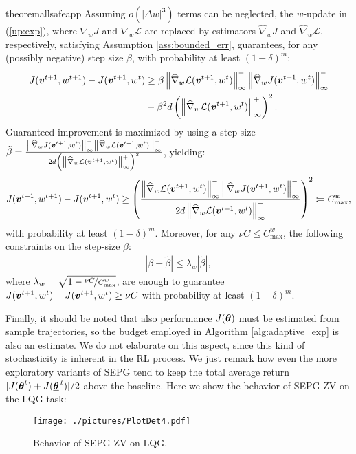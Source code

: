 \begin{restatable}[]{theorem}{allsafeapp}\label{th:safe_expapp}
	Assuming $o(|\Delta w|^3)$ terms can be neglected, the $w$-update in (\ref{up:exp}), where $\nabla_wJ$ and $\nabla_w\mathcal{L}$ are replaced by estimators $\widehat{\nabla}_wJ$ and $\widehat{\nabla}_w\mathcal{L}$, respectively, satisfying Assumption \ref{ass:bounded_err}, guarantees, for any (possibly negative) step size $\beta$, with probability at least $(1-\delta)^m$:
	\begin{align*}
	J(\vv^{t+1},w^{t+1}) - J(\vv^{t+1},w^t) 
	&\geq \beta\norm[\infty]{\widehat{\nabla}_w\mathcal{L}(\vv^{t+1},w^t)}^
	-\norm[\infty]{\widehat{\nabla}_wJ(\vv^{t+1},w^t)}^-\\
	&-
	\beta^2 d \left(\norm[\infty]{\widehat{\nabla}_w\mathcal{L}(\vv^{t+1},w^t)}^+\right)^2.
	\end{align*}
	Guaranteed improvement is maximized by using a step size $\tilde{\beta} =\frac{\norm[\infty]{\widehat{\nabla}_wJ(\vv^{t+1},w^t)}^-\norm[\infty]{\widehat{\nabla}_w\mathcal{L}(\vv^{t+1},w^t)}^-}{2d\left(\norm[\infty]{\widehat{\nabla}_w\mathcal{L}(\vv^{t+1},w^t)}^+\right)^2}$, yielding:
	\begin{align*}
	J(\vv^{t+1},w^{t+1}) - J(\vv^{t+1}, w^t) \geq 
	\left(\frac{\norm[\infty]{\widehat{\nabla}_w\mathcal{L}(\vv^{t+1},w^t)}^
		-\norm[\infty]{\widehat{\nabla}_wJ(\vv^{t+1},w^t)}^-}
	{2d\norm[\infty]{\widehat{\nabla}_w\mathcal{L}(\vv^{t+1},w^t)}^+}\right)^2
	\coloneqq C_{\text{max}}^w,
	\end{align*}
	with probability at least $(1-\delta)^m$. Moreover, for any $\nu C\leq C_{\text{max}}^{w}$, the following constraints on the step-size $\beta$:
	\begin{align}
	|\beta - \tilde{\beta}| \leq \lambda_{w}|\tilde{\beta}|,
	\end{align}
	where $\lambda_{w}=\sqrt{1 - \nicefrac{\nu C}{C_{\text{max}}^{w}}}$, are enough to guarantee $J(\vv^{t+1},w^t) - J(\vv^{t+1},w^t)\geq \nu C$ with probability at least $(1-\delta)^m$.
\end{restatable}

Finally, it should be noted that also performance $J(\vtheta)$ must be estimated from sample trajectories, so the budget employed in Algorithm \ref{alg:adaptive_exp} is also an estimate. We do not elaborate on this aspect, since this kind of stochasticity is inherent in the RL process. We just remark how even the more exploratory variants of SEPG tend to keep the total average return $[J(\vtheta^t) + J(\vtarget)]/2$ above the baseline.
Here we show the behavior of SEPG-ZV on the LQG task:
\begin{figure}[h!]
\centering
\texttt{[image: ./pictures/PlotDet4.pdf]}
\caption{Behavior of SEPG-ZV on LQG.} 
\label{fig:ZV_LQG}
\end{figure} 

